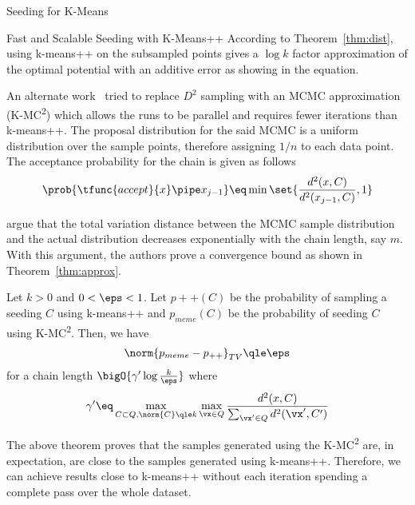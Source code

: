 \documentclass[10pt]{article}
\begin{document}
\begin{psection}{Seeding for K-Means}
\begin{psubsection}{Fast and Scalable Seeding with K-Means++}
        According to Theorem~\ref{thm:dist}, using k-means++ on the subsampled points
        gives a $\log k$ factor approximation of the optimal potential with an additive
        error as showing in the equation.

        An alternate work~\cite{approx-kmeanspp} tried to replace $D^2$ sampling with an
        MCMC approximation (K-MC\textsuperscript{2}) which allows the runs to be
        parallel and requires fewer iterations than k-means++. The proposal distribution
        for the said MCMC is a uniform distribution over the sample points, therefore
        assigning $1/n$ to each data point. The acceptance probability for the chain is
        given as follows
        \begin{align*}
            \prob{\tfunc{accept}{x} \pipe x_{j - 1}}
                \eq \min \set{\frac{d^2(x, C)}{d^2(x_{j - 1}, C)}, 1}
        \end{align*}

        \citet{approx-kmeanspp} argue that the total variation distance between the
        MCMC sample distribution and the actual distribution decreases exponentially
        with the chain length, say $m$. With this argument, the authors prove a
        convergence bound as shown in Theorem~\ref{thm:approx}.

        \begin{theorem}
            Let $k > 0$ and $0 < \eps < 1$. Let $p++(C)$ be the probability of sampling
            a seeding $C$ using k-means++ and $p_{meme}(C)$ be the probability of
            seeding $C$ using K-MC\textsuperscript{2}. Then, we have
            \begin{align*}
                \norm{p_{meme} - p_{++}}_{TV} \qle \eps
            \end{align*}
            for a chain length $\bigO{\gamma' \log \frac{k}{\eps}}$ where
            \begin{align*}
                \gamma' \eq \max_{C \subset Q, \norm{C} \qle k} \max_{\vx \in Q} \frac{d^2(x, C)}{\sum_{\vx' \in Q} d^2(\vx', C')}
            \end{align*}
        \end{theorem}

        The above theorem proves that the samples generated using the
        K-MC\textsuperscript{2} are, in expectation, are close to the samples generated
        using k-means++. Therefore, we can achieve results close to k-means++ without 
        each iteration spending a complete pass over the whole dataset.


\end{psubsection}
\end{psection}
\end{document}
